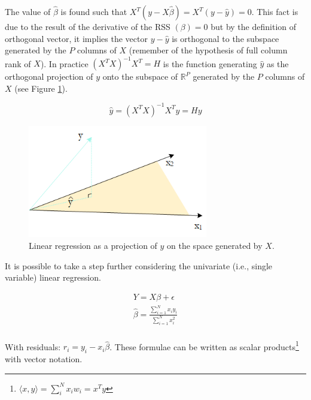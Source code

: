 The value of $\hat{\beta}$ is found such that $X^T\left(y-X\hat{\beta}\right)=X^T\left(y-\hat{y}\right)=0$. This fact is due to the result of the derivative of the RSS $\left(\beta\right)=0$ but by the definition of orthogonal vector, it implies the vector $y-\hat{y}$ is orthogonal to the subspace generated by the $P$ columns of $X$ (remember of the hypothesis of full column rank of $X$). In practice $\left(X^TX\right)^{-1}X^T=H$ is the function generating $\hat{y}$ as the orthogonal projection of $y$ onto the subspace of $\mathbb{R}^P$ generated by the $P$ columns of $X$ (see Figure \ref{fig_projection}).

\begin{equation}
\hat{y}=\left(X^TX\right)^{-1}X^Ty=Hy
\label{eq_OLSgeo2}
\end{equation}

\begin{figure}[hbt!]
\centering
\includegraphics[width=0.7\textwidth]{SectionLetsMath/linearRegression_figures/fig_projection.png}
\captionsetup{type=figure}
\caption{Linear regression as a projection of $y$ on the space generated by $X$.}
\label{fig_projection}
\end{figure}

It is possible to take a step further considering the univariate (i.e., single variable) linear regression.

\begin{equation}
\begin{split}
Y=X\beta+\epsilon \\
\hat{\beta}=\frac{\sum_{i=1}^{N}{x_iy_i}}{\sum_{i=1}^{N}x_i^2}\\
\end{split}
\label{eq_OLSgeo3}
\end{equation}

With residuals: $r_i=y_i-x_i\hat{\beta}$. These formulae can be written as scalar products\footnote{$\langle x,y \rangle=\sum_{i}^{N}x_iw_i=x^Ty$} with vector notation. 


